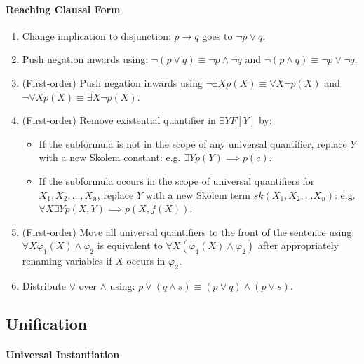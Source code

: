 \documentclass[twocolumn,english]{article}
\begin{document}
\paragraph{Reaching Clausal Form}
\begin{enumerate}
\item Change implication to disjunction: $p\rightarrow q$ goes to $\lnot p\lor q$. 
\item Push negation inwards using: $\lnot\left(p\lor q\right)\equiv\lnot p\land\lnot q$
and $\lnot\left(p\land q\right)\equiv\lnot p\lor\lnot q$. 
\item (First-order) Push negation inwards using $\lnot\exists Xp\left(X\right)\equiv\forall X\lnot p\left(X\right)$
and $\lnot\forall Xp\left(X\right)\equiv\exists X\lnot p\left(X\right)$. 
\item (First-order) Remove existential quantifier in $\exists YF\left[Y\right]$
by: 
\begin{itemize}
\item If the subformula is not in the scope of any universal quantifier,
replace $Y$ with a new Skolem constant: e.g. $\exists Yp\left(Y\right)\implies p\left(c\right)$. 
\item If the subformula occurs in the scope of universal quantifiers for
$X_{1},X_{2},\dots,X_{n}$, replace $Y$ with a new Skolem term $sk\left(X_{1},X_{2},\dots X_{n}\right)$:
e.g. $\forall X\exists Yp\left(X,Y\right)\implies p\left(X,f\left(X\right)\right)$. 
\end{itemize}
\item (First-order) Move all universal quantifiers to the front of the sentence
using: $\forall X\varphi_{1}\left(X\right)\land\varphi_{2}$ is equivalent
to $\forall X\left(\varphi_{1}\left(X\right)\land\varphi_{2}\right)$
after appropriately renaming variables if $X$ occurs in $\varphi_{2}$. 
\item Distribute $\lor$ over $\land$ using: $p\lor\left(q\land s\right)\equiv\left(p\lor q\right)\land\left(p\lor s\right)$. 
\end{enumerate}

\subsection{Unification}

\paragraph{Universal Instantiation}
\end{document}

